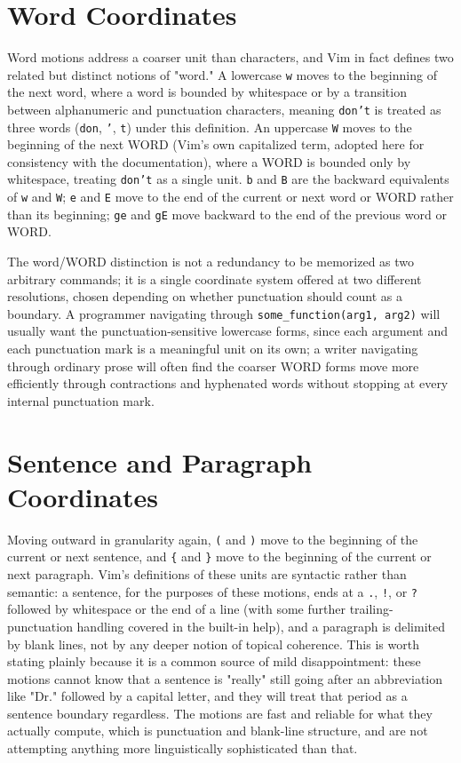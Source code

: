 \section{Word Coordinates}

Word motions address a coarser unit than characters, and Vim in fact defines two related but distinct notions of "word." A lowercase \texttt{w} moves to the beginning of the next word, where a word is bounded by whitespace or by a transition between alphanumeric and punctuation characters, meaning \texttt{don't} is treated as three words (\texttt{don}, \texttt{'}, \texttt{t}) under this definition. An uppercase \texttt{W} moves to the beginning of the next WORD (Vim's own capitalized term, adopted here for consistency with the documentation), where a WORD is bounded only by whitespace, treating \texttt{don't} as a single unit. \texttt{b} and \texttt{B} are the backward equivalents of \texttt{w} and \texttt{W}; \texttt{e} and \texttt{E} move to the end of the current or next word or WORD rather than its beginning; \texttt{ge} and \texttt{gE} move backward to the end of the previous word or WORD.

The word/WORD distinction is not a redundancy to be memorized as two arbitrary commands; it is a single coordinate system offered at two different resolutions, chosen depending on whether punctuation should count as a boundary. A programmer navigating through \texttt{some\_function(arg1, arg2)} will usually want the punctuation-sensitive lowercase forms, since each argument and each punctuation mark is a meaningful unit on its own; a writer navigating through ordinary prose will often find the coarser WORD forms move more efficiently through contractions and hyphenated words without stopping at every internal punctuation mark.

\section{Sentence and Paragraph Coordinates}

Moving outward in granularity again, \texttt{(} and \texttt{)} move to the beginning of the current or next sentence, and \texttt{\{} and \texttt{\}} move to the beginning of the current or next paragraph. Vim's definitions of these units are syntactic rather than semantic: a sentence, for the purposes of these motions, ends at a \texttt{.}, \texttt{!}, or \texttt{?} followed by whitespace or the end of a line (with some further trailing-punctuation handling covered in the built-in help), and a paragraph is delimited by blank lines, not by any deeper notion of topical coherence. This is worth stating plainly because it is a common source of mild disappointment: these motions cannot know that a sentence is "really" still going after an abbreviation like "Dr." followed by a capital letter, and they will treat that period as a sentence boundary regardless. The motions are fast and reliable for what they actually compute, which is punctuation and blank-line structure, and are not attempting anything more linguistically sophisticated than that.

